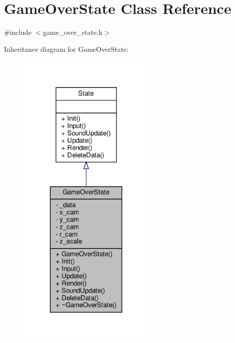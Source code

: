 \hypertarget{classGameOverState}{}\section{Game\+Over\+State Class Reference}
\label{classGameOverState}


{\ttfamily \#include $<$game\+\_\+over\+\_\+state.\+h$>$}



Inheritance diagram for Game\+Over\+State\+:
\nopagebreak
\begin{figure}[H]
\begin{center}
\leavevmode
\includegraphics[width=188pt]{classGameOverState__inherit__graph}
\end{center}
\end{figure}


